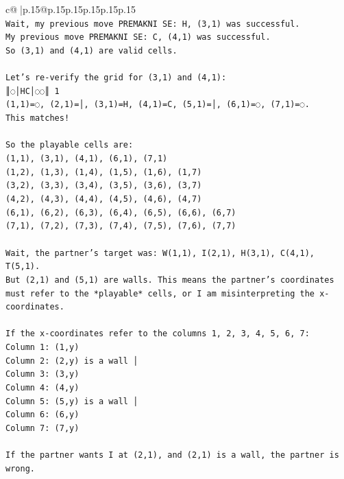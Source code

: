 \documentclass{article}
\begin{document}
{\begin{supertabular}{c@{$\;$}|p{.15\linewidth}@{}p{.15\linewidth}p{.15\linewidth}p{.15\linewidth}p{.15\linewidth}p{.15\linewidth}}
{{{\\ 
\texttt{Wait, my previous move PREMAKNI SE: H, (3,1) was successful.} \\
\texttt{My previous move PREMAKNI SE: C, (4,1) was successful.} \\
\texttt{So (3,1) and (4,1) are valid cells.} \\
\\ 
\texttt{Let's re{-}verify the grid for (3,1) and (4,1):} \\
\texttt{║◌│HC│◌◌║ 1} \\
\texttt{(1,1)=◌, (2,1)=│, (3,1)=H, (4,1)=C, (5,1)=│, (6,1)=◌, (7,1)=◌.} \\
\texttt{This matches!} \\
\\ 
\texttt{So the playable cells are:} \\
\texttt{(1,1), (3,1), (4,1), (6,1), (7,1)} \\
\texttt{(1,2), (1,3), (1,4), (1,5), (1,6), (1,7)} \\
\texttt{(3,2), (3,3), (3,4), (3,5), (3,6), (3,7)} \\
\texttt{(4,2), (4,3), (4,4), (4,5), (4,6), (4,7)} \\
\texttt{(6,1), (6,2), (6,3), (6,4), (6,5), (6,6), (6,7)} \\
\texttt{(7,1), (7,2), (7,3), (7,4), (7,5), (7,6), (7,7)} \\
\\ 
\texttt{Wait, the partner's target was: W(1,1), I(2,1), H(3,1), C(4,1), T(5,1).} \\
\texttt{But (2,1) and (5,1) are walls. This means the partner's coordinates must refer to the *playable* cells, or I am misinterpreting the x{-}coordinates.} \\
\\ 
\texttt{If the x{-}coordinates refer to the columns 1, 2, 3, 4, 5, 6, 7:} \\
\texttt{Column 1: (1,y)} \\
\texttt{Column 2: (2,y) is a wall │} \\
\texttt{Column 3: (3,y)} \\
\texttt{Column 4: (4,y)} \\
\texttt{Column 5: (5,y) is a wall │} \\
\texttt{Column 6: (6,y)} \\
\texttt{Column 7: (7,y)} \\
\\ 
\texttt{If the partner wants I at (2,1), and (2,1) is a wall, the partner is wrong.} \\
}}}
\end{supertabular}}
\end{document}
